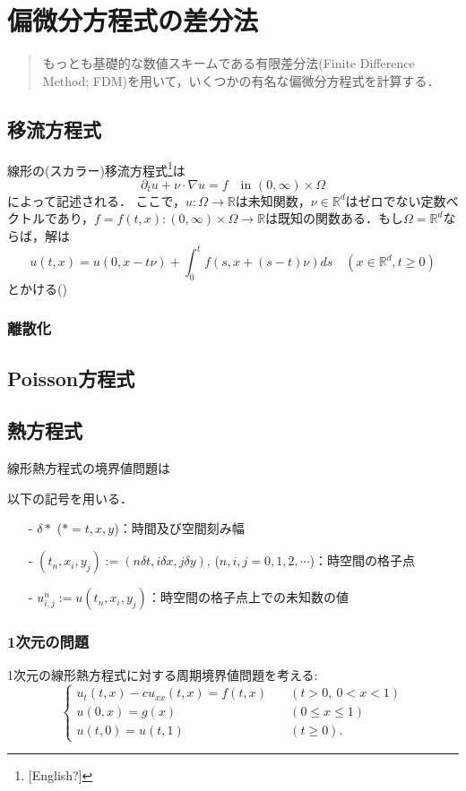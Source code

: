 \chapter{偏微分方程式の差分法}
\begin{abstract}
もっとも基礎的な数値スキームである有限差分法(Finite Difference Method; FDM)を用いて，いくつかの有名な偏微分方程式を計算する．
\end{abstract}

\section{移流方程式}
線形の(スカラー)移流方程式\footnote{[English?]}は
\begin{equation}
\partial_t u+\nu\cdot\nabla u=f\quad\text{in $(0,\infty)\times\Omega$}
\end{equation}
によって記述される．
ここで，$u:\Omega\to\mathbb{R}$は未知関数，$\nu\in\mathbb{R}^d$はゼロでない定数ベクトルであり，$f=f(t,x):(0,\infty)\times\Omega\to\mathbb{R}$は既知の関数ある．もし$\Omega=\mathbb{R}^d$ならば，解は
$$
u(t,x)=u(0,x-t\nu)+\int_0^t f(s,x+(s-t)\nu)ds\quad(x\in\mathbb{R}^d,t\ge0)
$$
とかける(\cite[Section 2.1.2]{evans})

\subsection{離散化}


\section{Poisson方程式}





\section{熱方程式}
線形熱方程式の境界値問題は


以下の記号を用いる．
\begin{itemize}
\item[-] $\delta \ast$ ($\ast=t,x,y$)：時間及び空間刻み幅
\item[-] $(t_n ,x_i ,y_j):=(n \delta t,i \delta x,j \delta y)$, ($n,i,j=0,1,2,\cdots$)：時空間の格子点
\item[-] $u^{n}_{i,j}:=u(t_n, x_i, y_j)$：時空間の格子点上での未知数の値
\end{itemize}

\subsection{ 1次元の問題}
1次元の線形熱方程式に対する周期境界値問題を考える:
\begin{equation}
\label{e:heat1d}
	\begin{cases}
		u_t(t,x)-cu_{xx}(t,x)=f(t,x)\quad&(t>0,\ 0<x<1)\\
		u(0,x)=g(x)\quad&(0\le x\le 1)\\
		u(t,0)=u(t,1)\quad&(t\ge0).
	\end{cases}
\end{equation}

